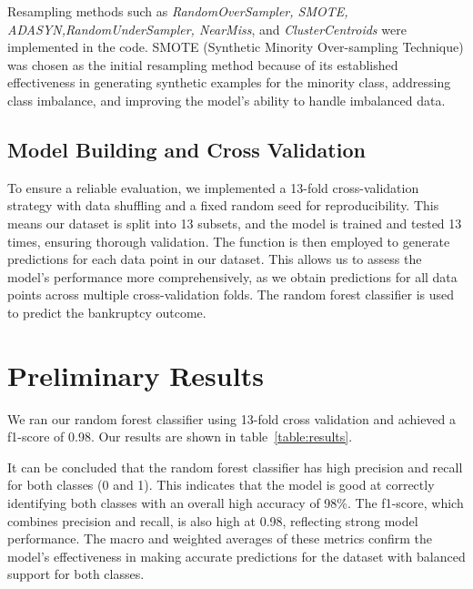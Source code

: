 \documentclass{article}
\newcommand{\ttt}[1]{%
  \begingroup
    \protect\renewcommand{\seqinsert}{\ifmmode\allowbreak\else\-\fi}%
    \protect\texttt{\protect\seqinsert{\protect\seqsplit{\small#1}}}%
  \endgroup
}
\begin{document}
Resampling methods such as \emph{RandomOverSampler, SMOTE, ADASYN,RandomUnderSampler, NearMiss}, and \emph{ClusterCentroids} were implemented in the code. 
SMOTE (Synthetic Minority Over-sampling Technique) was chosen as the initial resampling method because of its established effectiveness in generating synthetic examples for the minority class, addressing class imbalance, and improving the model's ability to handle imbalanced data. 

\subsection{Model Building and Cross Validation}
\label{ssec:model-cv}
To ensure a reliable evaluation, we implemented a 13-fold cross-validation strategy with data shuffling and a fixed random seed for reproducibility. This means our dataset is split into 13 subsets, and the model is trained and tested 13 times, ensuring thorough validation.
The \ttt{cross\_val\_predict} function is then employed to generate predictions for each data point in our dataset. 
This allows us to assess the model's performance more comprehensively, as we obtain predictions for all data points across multiple cross-validation folds.
The random forest classifier is used to predict the bankruptcy outcome.




\section{Preliminary Results}
\label{sec:results}

We ran our random forest classifier using 13-fold cross validation and achieved a f1-score of 0.98. Our results are shown in table~\ref{table:results}.

It can be concluded that the random forest classifier  has high precision and recall for both classes (0 and 1).
This indicates that the model is good at correctly identifying both classes with an overall high accuracy of 98\%. 
The f1-score, which combines precision and recall, is also high at 0.98, reflecting strong model performance. 
The macro and weighted averages of these metrics confirm the model's effectiveness in making accurate predictions for the dataset with balanced support for both classes.
\end{document}
